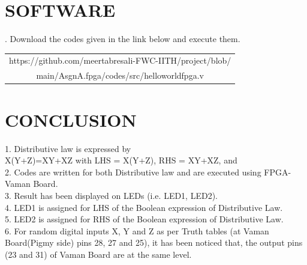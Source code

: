 \documentclass[journal,10pt,twocolumn]{article}
\begin{document}
\section{SOFTWARE}
. Download the codes given in the link below and execute them.\\

\begin{table}[h]
\centering
\begin{tabular}{| c |} \hline
 \rule{0pt}{20pt} https://github.com/meertabresali-FWC-IITH/project/blob/\\
 main/AsgnA.fpga/codes/src/helloworldfpga.v \\\hline
\end{tabular}
\end{table}



\section{CONCLUSION}
\begin{flushleft}
1. Distributive law is expressed by \\
\vspace{0.25cm}
X(Y+Z)=XY+XZ with LHS = X(Y+Z), RHS = XY+XZ, and \\
\vspace{0.25cm}
2. Codes are written for both Distributive law and are executed using FPGA-Vaman Board.\\
3. Result has been displayed on LEDs (i.e. LED1, LED2). \\
4. LED1 is assigned for LHS of the Boolean expression of Distributive Law. \\
5. LED2 is assigned for RHS of the Boolean expression of Distributive Law. \\
6. For random digital inputs X, Y and Z as per Truth tables (at Vaman Board(Pigmy side)  pins 28, 27 and 25), it has been noticed that, the output pins (23 and 31) of Vaman Board are at the same level.\\

\end{flushleft}
\end{document}
